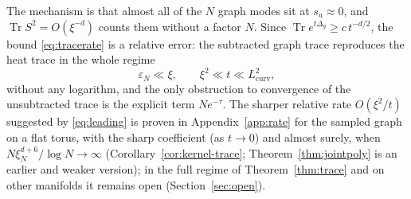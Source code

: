 \documentclass[11pt,a4paper]{article}
\theoremstyle{stmt}
\theoremstyle{defn}
\theoremstyle{rmk}
\numberwithin{equation}{section}
\DeclareMathOperator{\Tr}{Tr}
\newcommand{\Lcurv}{L_{\mathrm{curv}}}
\begin{document}
The mechanism is that almost all of the $N$ graph modes sit at $s_a\approx0$, and $\Tr S^2=O(\xi^{-d})$ counts them without a factor $N$. Since $\Tr e^{t\Delta_g}\ge c\,t^{-d/2}$, the bound \eqref{eq:tracerate} is a relative error: the subtracted graph trace reproduces the heat trace in the whole regime
\begin{equation}\label{eq:hier}
\varepsilon_N\ll\xi,\qquad \xi^2\ll t\ll\Lcurv^2 ,
\end{equation}
without any logarithm, and the only obstruction to convergence of the unsubtracted trace is the explicit term $Ne^{-\tau}$. The sharper relative rate $O(\xi^2/t)$ suggested by \eqref{eq:leading} is proven in Appendix~\ref{app:rate} for the sampled graph on a flat torus, with the sharp coefficient (as $t\to0$) and almost surely, when $N\xi_N^{d+6}/\log N\to\infty$ (Corollary~\ref{cor:kernel-trace}; Theorem~\ref{thm:jointpoly} is an earlier and weaker version); in the full regime of Theorem~\ref{thm:trace} and on other manifolds it remains open (Section~\ref{sec:open}).
\end{document}
